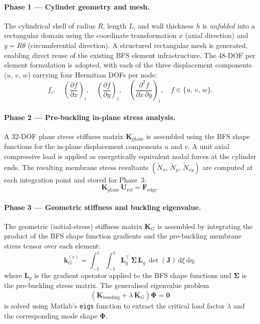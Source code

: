 \documentclass[9pt,a4paper,twoside]{tau-class/tau}
\begin{document}
\paragraph{Phase 1 --- Cylinder geometry and mesh.}
The cylindrical shell of radius $R$, length $L$, and wall thickness $h$ is
\emph{unfolded} into a rectangular domain using the coordinate transformation
$x$ (axial direction) and $y = R\theta$ (circumferential direction). A
structured rectangular mesh is generated, enabling direct reuse of the
existing BFS element infrastructure. The 48-DOF per element formulation is
adopted, with each of the three displacement components ($u$, $v$, $w$)
carrying four Hermitian DOFs per node:
%
\begin{equation}
    f_i,\quad
    \left(\frac{\partial f}{\partial x}\right)_i,\quad
    \left(\frac{\partial f}{\partial y}\right)_i,\quad
    \left(\frac{\partial^2 f}{\partial x\,\partial y}\right)_i,
    \quad f \in \{u,\,v,\,w\}.
    \label{eq:dofs}
\end{equation}

\paragraph{Phase 2 --- Pre-buckling in-plane stress analysis.}
A 32-DOF plane stress stiffness matrix $\mathbf{K}_{\mathrm{plane}}$ is
assembled using the BFS shape functions for the in-plane displacement
components $u$ and $v$. A unit axial compressive load is applied as
energetically equivalent nodal forces at the cylinder ends. The resulting
membrane stress resultants $(\tilde{N}_x,\,\tilde{N}_y,\,\tilde{N}_{xy})$
are computed at each integration point and stored for Phase~3:
%
\begin{equation}
    \mathbf{K}_{\mathrm{plane}}\,\mathbf{U}_{\mathrm{ref}}
    = \mathbf{F}_{\mathrm{edge}}.
    \label{eq:prestress}
\end{equation}

\paragraph{Phase 3 --- Geometric stiffness and buckling eigenvalue.}
The geometric (initial-stress) stiffness matrix $\mathbf{K}_G$ is assembled
by integrating the product of the BFS shape function gradients and the
pre-buckling membrane stress tensor over each element:
%
\begin{equation}
    \mathbf{k}_G^{(e)} 
    = \int_{-1}^{1}\int_{-1}^{1}
      \mathbf{L}_g^\top\,\boldsymbol{\Sigma}\,\mathbf{L}_g\,
      \det(\mathbf{J})\,\mathrm{d}\xi\,\mathrm{d}\eta,
    \label{eq:KG}
\end{equation}
%
where $\mathbf{L}_g$ is the gradient operator applied to the BFS shape
functions and $\boldsymbol{\Sigma}$ is the pre-buckling stress matrix. The
generalised eigenvalue problem
%
\begin{equation}
    \left(\mathbf{K}_{\mathrm{bending}} + \lambda\,\mathbf{K}_G\right)
    \boldsymbol{\Phi} = \mathbf{0}
    \label{eq:eig}
\end{equation}
%
is solved using Matlab's \texttt{eigs} function to extract the critical load
factor $\lambda$ and the corresponding mode shape $\boldsymbol{\Phi}$.
\end{document}
